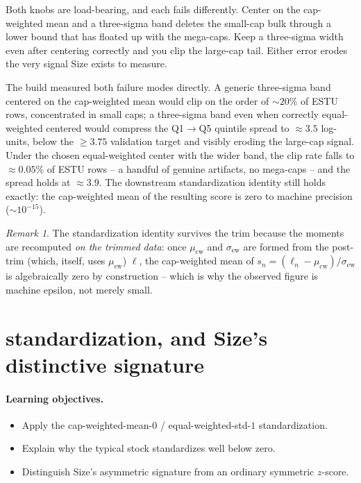 \documentclass[11pt]{article}
\theoremstyle{definition}
\theoremstyle{plain}
\theoremstyle{remark}
\newtheorem*{remark}{Remark}
\begin{document}
\begin{pitfall}
Both knobs are load-bearing, and each fails differently. Center on the cap-weighted mean and a three-sigma band deletes the small-cap bulk through a lower bound that has floated up with the mega-caps. Keep a three-sigma width even after centering correctly and you clip the large-cap tail. Either error erodes the very signal Size exists to measure.
\end{pitfall}

\begin{observed}
The build measured both failure modes directly. A generic three-sigma band centered on the cap-weighted mean would clip on the order of $\sim20\%$ of ESTU rows, concentrated in small caps; a three-sigma band even when correctly equal-weighted centered would compress the Q1$\to$Q5 quintile spread to $\approx3.5$ log-units, below the $\geq3.75$ validation target and visibly eroding the large-cap signal. Under the chosen equal-weighted center with the wider band, the clip rate falls to $\approx 0.05\%$ of ESTU rows -- a handful of genuine artifacts, no mega-caps -- and the spread holds at $\approx3.9$. The downstream standardization identity still holds exactly: the cap-weighted mean of the resulting score is zero to machine precision ($\sim 10^{-15}$).
\end{observed}

\begin{remark}
The standardization identity survives the trim because the moments are recomputed \emph{on the trimmed data}: once $\mu_{\mathrm{cw}}$ and $\sigma_{\mathrm{ew}}$ are formed from the post-trim (which, itself, uses $\mu_{\mathrm{ew}}$) $\ell$, the cap-weighted mean of $s_n=(\ell_n-\mu_{\mathrm{cw}})/\sigma_{\mathrm{ew}}$ is algebraically zero by construction -- which is why the observed figure is machine epsilon, not merely small.
\end{remark}

\section{standardization, and Size's distinctive signature}\label{sec:std}

\paragraph{Learning objectives.}
\begin{itemize}[leftmargin=1.4em,topsep=2pt,itemsep=1pt]
  \item Apply the cap-weighted-mean-$0$ / equal-weighted-std-$1$ standardization.
  \item Explain why the typical stock standardizes well below zero.
  \item Distinguish Size's asymmetric signature from an ordinary symmetric $z$-score.
\end{itemize}
\end{document}

